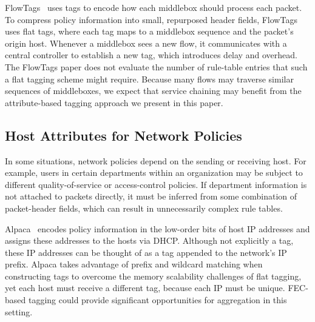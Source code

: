 FlowTags~\cite{flowtags} uses tags to encode how each middlebox should
process each packet. To compress policy information into small,
repurposed header fields, FlowTags uses flat tags, where each tag maps
to a middlebox sequence and the packet's origin host. Whenever a
middlebox sees a new flow, it communicates with a central controller
to establish a new tag, which introduces delay and overhead.  The
FlowTags paper does not evaluate the number of rule-table entries that
such a flat tagging scheme might require. Because many flows may
traverse similar sequences of middleboxes, we expect that service
chaining may benefit from the attribute-based tagging approach we
present in this paper. 

\subsection{Host Attributes for Network Policies}
In some situations, network policies depend on the sending or
receiving host.  For example, users in certain departments within an
organization may be subject to different quality-of-service or 
access-control policies. If department information is not attached to packets
directly, it must be inferred from some combination of packet-header
fields, which can result in unnecessarily complex rule tables.

Alpaca~\cite{alpaca} encodes policy information in the low-order bits
of host IP addresses and assigns these addresses to the hosts via
DHCP. Although not explicitly a tag, these IP addresses can be thought
of as a tag appended to the network's IP prefix. Alpaca takes
advantage of prefix and wildcard matching when constructing tags to
overcome the memory scalability challenges of flat tagging, yet each
host must receive a different tag, because each IP must be
unique. FEC-based tagging could provide significant opportunities for
aggregation in this setting.


